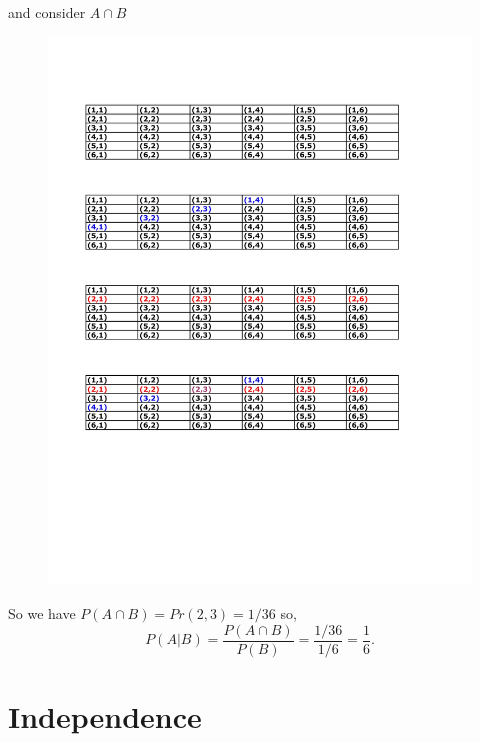\documentclass[notes=show, handout]{beamer}\usepackage[]{graphicx}\usepackage[]{color}
\newcommand{\nn}{\nonumber}
\begin{document}
\begin{frame}{\secname}

  \begin{example} [A check]
  and consider $A \cap B$

  \begin{figure}[h!]
  \centering
  \includegraphics[scale=0.7]{img/c4.pdf}
  \end{figure}
  So we have  $P(A \cap B) = Pr (2,3) = 1/36$ so,
  $$
  P(A\vert B) = \frac{P(A \cap B)}{P(B)}  =  \frac{1/36}{1/6} = \frac{1}{6}. \nn
  $$
  \end{example}
\end{frame}

\section{Independence}
\end{document}
